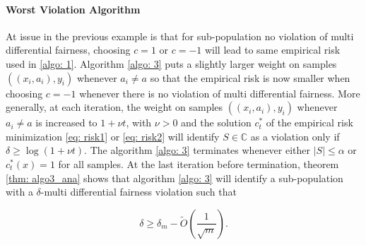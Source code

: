 \documentclass{article}
\begin{document}
\paragraph{Worst Violation Algorithm}
At issue in the previous example is that for sub-population no violation of multi differential fairness, choosing $c=1$ or $c=-1$ will lead to same empirical risk used in \ref{algo: 1}. Algorithm \ref{algo: 3} puts a slightly larger weight on samples $((x_{i}, a_{i}), y_{i})$ whenever $a_{i}\neq a$ so that the empirical risk is now smaller when choosing $c=-1$ whenever there is no violation of multi differential fairness.  More generally, at each iteration, the weight on samples $((x_{i}, a_{i}), y_{i})$ whenever $a_{i}\neq a$ is increased to $1 + \nu t$, with $\nu > 0$ and the solution $c_{t}^{*}$ of the empirical risk minimization \eqref{eq: risk1} or \eqref{eq: risk2} will identify $S\in \mathbb{C}$ as a violation only if $\delta \geq \log(1 + \nu t)$. The algorithm \ref{algo: 3} terminates whenever either $|S|\leq \alpha$ or $c^{*}_{t}(x)=1$ for all samples. At the last iteration before termination, theorem \ref{thm: algo3_ana} shows that algorithm \ref{algo: 3} will identify a sub-population with a $\delta$-multi differential fairness violation such that

\begin{equation}
\delta \geq \delta_{m} - \tilde{O}\left(\frac{1}{\sqrt{m}}\right).
\end{equation}
\end{document}
